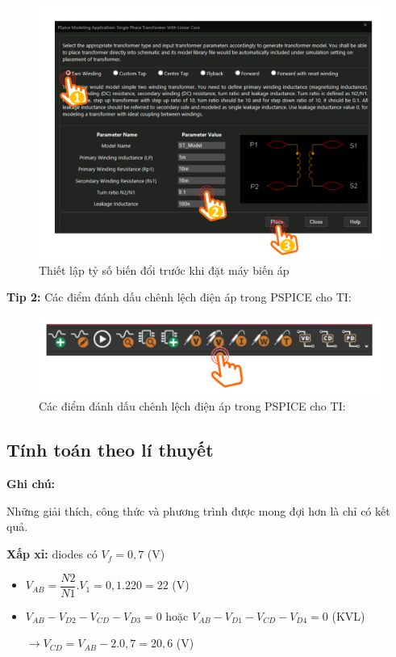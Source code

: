 \begin{itemize}
\begin{figure}[ht]
    {\centering
        \includegraphics[scale=0.3]{graphics/ex7/f3.png}
        \caption{Thiết lập tỷ số biến đổi trước khi đặt máy biến áp}}
  
\end{figure}
\end{itemize}

\textbf{Tip 2:} Các điểm đánh dấu chênh lệch điện áp trong PSPICE cho TI:
\begin{figure}[h]
\centering
        \includegraphics[scale=0.3]{graphics/ex7/f4.png}
        \caption{Các điểm đánh dấu chênh lệch điện áp trong PSPICE cho TI:}
\end{figure}
\newpage
\subsection{Tính toán theo lí thuyết}
\textbf{Ghi chú:}

Những giải thích, công thức và phương trình được mong đợi hơn là chỉ có kết quả.

\textbf{Xấp xỉ:} diodes có \(V_f = 0,7\) (V)
\begin{itemize}
    \item \(V_{AB} = \dfrac{N2}{N1}.V_1 = 0,1.220 = 22\) (V)
    \item \(V_{AB} - V_{D2} - V_{CD} - V_{D3} = 0\) hoặc \(V_{AB} - V_{D1} - V_{CD} - V_{D4} = 0\) (KVL)

\(\rightarrow V_{CD} = V_{AB} - 2.0,7 = 20,6 \) (V)
\end{itemize}

